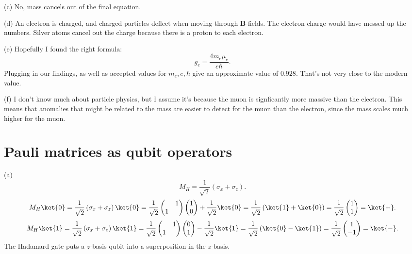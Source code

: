 \documentclass[11pt, letterpaper]{article}
\begin{document}
(c) No, mass cancels out of the final equation.

(d) An electron is charged, and charged particles deflect when moving through $\mathbf{B} $-fields. The electron charge would have messed up the numbers. Silver atoms cancel out the charge because there is a proton to each electron.

(e) Hopefully I found the right formula:
\[
	g_e = \frac{4 m_e\mu _e}{e \hbar} 
.\]
Plugging in our findings, as well as accepted values for $m_e,e,\hbar$ give an approximate value of $0.928$. That's not very close to the modern value.

(f) I don't know much about particle physics, but I assume it's because the muon is signficantly more massive than the electron. This means that anomalies that might be related to the mass are easier to detect for the muon than the electron, since the mass scales much higher for the muon.
\section{Pauli matrices as qubit operators}
(a)
\[
	M_H = \frac{1}{\sqrt{2} } \left( \sigma _x + \sigma _z \right) 
.\]
\[
	M_H \ket{0}=\frac{1}{\sqrt{2} } \left( \sigma _x+\sigma _z \right) \ket{0}=\frac{1}{\sqrt{2} } \begin{pmatrix}
	 & 1 \\
	1 & 
	\end{pmatrix}\begin{pmatrix}
	1 \\
	0
\end{pmatrix}+\frac{1}{\sqrt{2} } \ket{0}=\frac{1}{\sqrt{2} } \left( \ket{1}+\ket{0} \right) =\frac{1}{\sqrt{2} } \begin{pmatrix}
1 \\
1
\end{pmatrix}=\ket{+}
.\]
\[
	M_H \ket{1}=\frac{1}{\sqrt{2} } \left( \sigma _x+\sigma _z \right) \ket{1}=\frac{1}{\sqrt{2} } \begin{pmatrix}
	 & 1 \\
	1 & 
	\end{pmatrix}\begin{pmatrix}
	0 \\
	1
\end{pmatrix}-\frac{1}{\sqrt{2} } \ket{1}=\frac{1}{\sqrt{2} } \left( \ket{0}-\ket{1} \right) =\frac{1}{\sqrt{2} } \begin{pmatrix}
1 \\
-1
\end{pmatrix}=\ket{-}
.\]
The Hadamard gate puts a $z$-basis qubit into a superposition in the $z$-basis.
\end{document}

